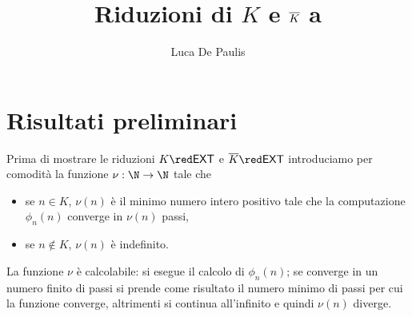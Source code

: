 \documentclass[
    a4paper,
    language=italian,
    oneside,
    10pt,
    article,
    thmstyle=professional
]{notes}
\title{Riduzioni di $K$ e $\compl{K}$ a \EXT}
\author{Luca De Paulis}
\renewcommand{\compl}[1]{\overline{#1}}
\newcommand{\EXT}{\normalfont\textsf{EXT}}
\begin{document}
    \maketitle

    \section{Risultati preliminari}

    Prima di mostrare le riduzioni $K \red \EXT$ e $\compl{K} \red \EXT$
    introduciamo per comodità la funzione $\nu : \N \to \N$ tale che 
    \begin{itemize}[label={\tiny\raisebox{0.4ex}{\textbullet}}]
        \item se $n \in K$, $\nu(n)$ è il minimo numero intero positivo
            tale che la computazione $\phi_n(n)$ converge 
            in $\nu(n)$ passi,
        \item se $n \notin K$, $\nu(n)$ è indefinito. 
    \end{itemize}

    La funzione $\nu$ è calcolabile: si esegue il calcolo di $\phi_n(n)$;
    se converge in un numero finito di passi si prende come risultato
    il numero minimo di passi per cui la funzione converge,
    altrimenti si continua all'infinito e quindi $\nu(n)$ diverge.
\end{document}
